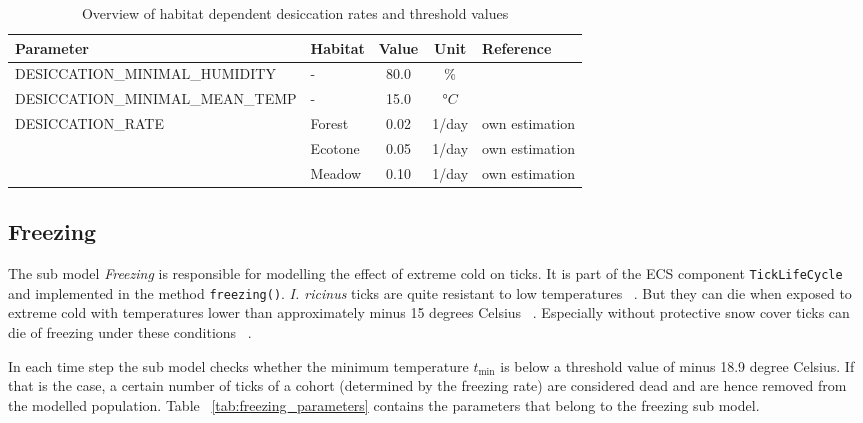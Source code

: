 \documentclass[a4paper, 11pt]{scrartcl}
\newcommand{\inlinecode}[1]{\texttt{\small #1}}
\begin{document}
\begin{table}[h!]
\caption[Overview of habitat-dependent desiccation rates and threshold values.]{Overview of habitat dependent desiccation rates and threshold values}
\label{tab:desiccation_parameters}
\begin{tabularx}{\textwidth}{llccl}
\toprule
\textbf{Parameter}							& \textbf{Habitat}  & \textbf{Value} & \textbf{Unit}	& \textbf{Reference} \\
\midrule
\multirow{3}{*}{\tiny{DESICCATION\_MINIMAL\_HUMIDITY}} 	& \multirow{3}{*}{-} & \multirow{3}{*}{80.0} & \multirow{3}{*}{\%} &  \textcite{Medlock.2013} \\
													   	& 					 & 						 &					   &  \textcite{Gray.2016}	\\
														& 					 & 						 &					   &  \textcite{Hauser.2018} \\
\tiny{DESICCATION\_MINIMAL\_MEAN\_TEMP} 	& -    			 		 &   15.0  & $°C$  &  \textcite{Ostfeld.2015} \\
\multirow{3}{*}{\tiny{DESICCATION\_RATE}}  	& Forest       			 &   0.02  & 1/day 	& own estimation \\
				 							& Ecotone 				 &   0.05  & 1/day  & own estimation \\
				 							& Meadow    			 &   0.10  & 1/day  & own estimation \\
\bottomrule
\end{tabularx}
\end{table}

\subsection{Freezing}
The sub model \emph{Freezing} is responsible for modelling the effect of extreme cold on ticks. It is part of the ECS component \inlinecode{TickLifeCycle} and implemented in the method \inlinecode{freezing()}. \emph{I. ricinus} ticks are quite resistant to low temperatures ~\parencite{Gray.2009}. But they can die when exposed to extreme cold with temperatures lower than approximately minus 15 degrees Celsius ~\parencite{Ostfeld.2015}. Especially without protective snow cover ticks can die of freezing under these conditions ~\parencite{Jore.2014}.

In each time step the sub model checks whether the minimum temperature $t_{\min}$ is below a threshold value of minus 18.9 degree Celsius. If that is the case, a certain number of ticks of a cohort (determined by the freezing rate) are considered dead and are hence removed from the modelled population. Table ~\ref{tab:freezing_parameters} contains the parameters that belong to the freezing sub model.
\end{document}

